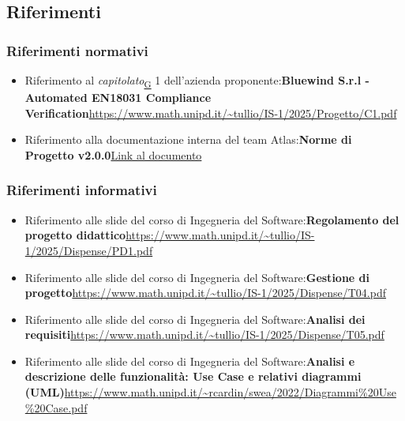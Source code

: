 ﻿\documentclass[a4paper,12pt]{article}
\begin{document}
{  \subsection{Riferimenti}{
      \subsubsection{Riferimenti normativi}{
          \begin{itemize}
              \item Riferimento al \textit{capitolato}\textsubscript{\href{https://atlasteam9.github.io/Atlas/glossario.html\#Capitolato}{G}} 1 dell'azienda proponente:\newline \textbf{Bluewind S.r.l - Automated EN18031 Compliance Verification}\newline \url{https://www.math.unipd.it/~tullio/IS-1/2025/Progetto/C1.pdf}
              \item Riferimento alla documentazione interna del team Atlas:\newline \textbf{Norme di Progetto v2.0.0}\newline\href{https://atlasteam9.github.io/Atlas/docs/PB/documenti/interni/Norme%20di%20Progetto.pdf}{Link al documento}
            \end{itemize}
      }

      \subsubsection{Riferimenti informativi}{
          \begin{itemize}
              \item Riferimento alle slide del corso di Ingegneria del Software:\newline \textbf{Regolamento del progetto didattico}\newline \url{https://www.math.unipd.it/~tullio/IS-1/2025/Dispense/PD1.pdf}
              \item Riferimento alle slide del corso di Ingegneria del Software:\newline \textbf{Gestione di progetto}\newline \url{https://www.math.unipd.it/~tullio/IS-1/2025/Dispense/T04.pdf}
              \item Riferimento alle slide del corso di Ingegneria del Software:\newline \textbf{Analisi dei requisiti}\newline \url{https://www.math.unipd.it/~tullio/IS-1/2025/Dispense/T05.pdf}
              \item Riferimento alle slide del corso di Ingegneria del Software:\newline \textbf{Analisi e descrizione delle funzionalità: Use Case e relativi diagrammi (UML)}\newline \url{https://www.math.unipd.it/~rcardin/swea/2022/Diagrammi%20Use%20Case.pdf} 
          \end{itemize}
      }
  }
 }
\end{document}
